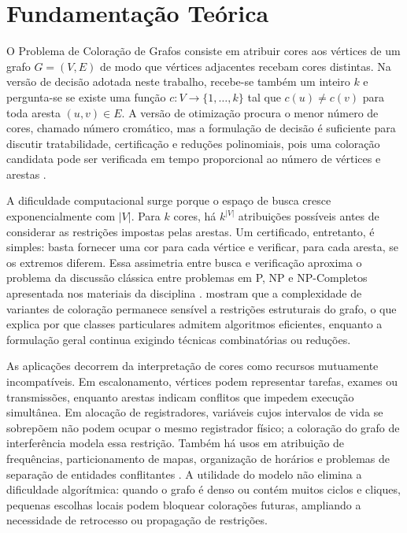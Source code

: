 \section{Fundamentação Teórica}\label{sec:secao_FundamentacaoTeorica}

O Problema de Coloração de Grafos consiste em atribuir cores aos vértices de um grafo $G=(V,E)$ de modo que vértices adjacentes recebam cores distintas. Na versão de decisão adotada neste trabalho, recebe-se também um inteiro $k$ e pergunta-se se existe uma função $c:V \rightarrow \{1,\ldots,k\}$ tal que $c(u)\neq c(v)$ para toda aresta $(u,v)\in E$. A versão de otimização procura o menor número de cores, chamado número cromático, mas a formulação de decisão é suficiente para discutir tratabilidade, certificação e reduções polinomiais, pois uma coloração candidata pode ser verificada em tempo proporcional ao número de vértices e arestas \parencite{cormen2024algoritmos,dasgupta2009algoritmos}.

A dificuldade computacional surge porque o espaço de busca cresce exponencialmente com $|V|$. Para $k$ cores, há $k^{|V|}$ atribuições possíveis antes de considerar as restrições impostas pelas arestas. Um certificado, entretanto, é simples: basta fornecer uma cor para cada vértice e verificar, para cada aresta, se os extremos diferem. Essa assimetria entre busca e verificação aproxima o problema da discussão clássica entre problemas em P, NP e NP-Completos apresentada nos materiais da disciplina \parencite{Silva2026PAA12}. \textcite{golovachSurveyComputationalComplexity2016} mostram que a complexidade de variantes de coloração permanece sensível a restrições estruturais do grafo, o que explica por que classes particulares admitem algoritmos eficientes, enquanto a formulação geral continua exigindo técnicas combinatórias ou reduções.

As aplicações decorrem da interpretação de cores como recursos mutuamente incompatíveis. Em escalonamento, vértices podem representar tarefas, exames ou transmissões, enquanto arestas indicam conflitos que impedem execução simultânea. Em alocação de registradores, variáveis cujos intervalos de vida se sobrepõem não podem ocupar o mesmo registrador físico; a coloração do grafo de interferência modela essa restrição. Também há usos em atribuição de frequências, particionamento de mapas, organização de horários e problemas de separação de entidades conflitantes \parencite{lewisGraphColouringVisual2026,artachoSolvingGraphColoring2016}. A utilidade do modelo não elimina a dificuldade algorítmica: quando o grafo é denso ou contém muitos ciclos e cliques, pequenas escolhas locais podem bloquear colorações futuras, ampliando a necessidade de retrocesso ou propagação de restrições.

